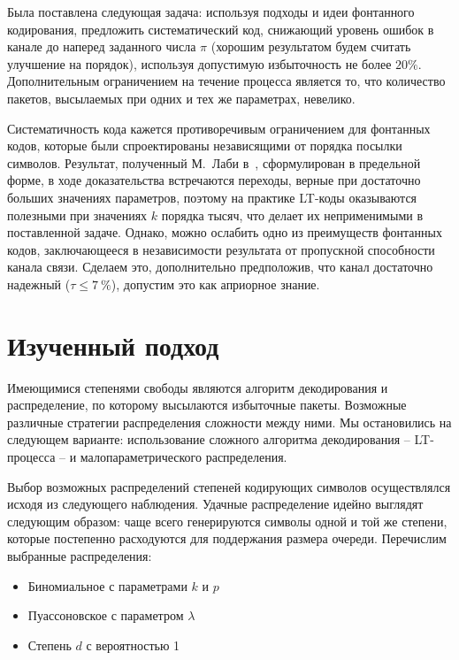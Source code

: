 Была поставлена следующая задача: используя подходы и идеи 
фонтанного кодирования,
предложить систематический код,
снижающий уровень ошибок в канале
до наперед заданного числа $\pi$ (хорошим результатом
будем считать улучшение на порядок),
используя допустимую избыточность не более $20\%$.
Дополнительным ограничением на течение
процесса является то, что 
количество пакетов, высылаемых при одних и тех же
параметрах, невелико.

Систематичность кода кажется противоречивым 
ограничением для фонтанных кодов, которые были спроектированы 
независящими от порядка посылки символов. Результат, полученный 
М.~Лаби в~\cite{Luby}, сформулирован в предельной форме, в ходе
доказательства встречаются переходы, верные 
при достаточно больших значениях параметров,
поэтому на практике LT-коды оказываются полезными
при значениях $k$ порядка тысяч, что делает их неприменимыми
в поставленной задаче. Однако, можно ослабить одно из
преимуществ фонтанных кодов, заключающееся в независимости
результата от пропускной способности канала связи. Сделаем это, 
дополнительно
предположив, что канал достаточно надежный ($\tau\le7\:\%$),
допустим это как априорное знание.

\section{Изученный подход}

Имеющимися степенями свободы являются алгоритм декодирования
и распределение, по которому
высылаются избыточные пакеты. 
Возможные различные стратегии распределения
сложности между ними. Мы остановились 
на следующем варианте: использование сложного 
алгоритма декодирования -- LT-процесса \cite{Luby} --
и малопараметрического распределения.

Выбор возможных распределений степеней кодирующих символов
осуществлялся исходя из 
следующего наблюдения. 
Удачные распределение идейно выглядят следующим образом:
чаще всего генерируются символы одной и той же степени, которые постепенно
расходуются для поддержания размера очереди.
Перечислим выбранные распределения:

\begin{itemize}

    \item Биномиальное с параметрами $k$ и $p$ 
    \item Пуассоновское с параметром $\lambda$
    \item Степень $d$ с вероятностью 1
    
\end{itemize}

